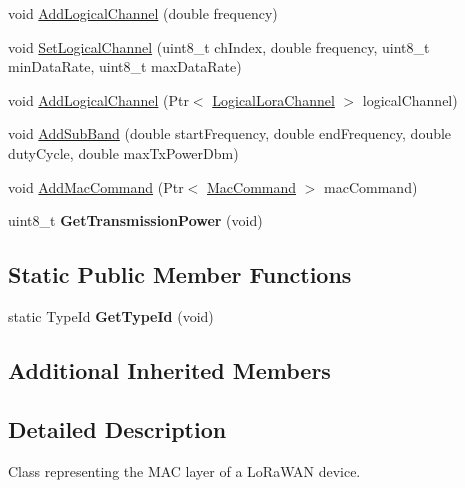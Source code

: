 \begin{DoxyCompactItemize}
void \hyperlink{classns3_1_1lorawan_1_1EndDeviceLoraMac_a35d02edc0a4259d5a6a165579a08391b}{Add\+Logical\+Channel} (double frequency)
\item 
void \hyperlink{classns3_1_1lorawan_1_1EndDeviceLoraMac_aad7490b330e71e9d664dd278b2c294b6}{Set\+Logical\+Channel} (uint8\+\_\+t ch\+Index, double frequency, uint8\+\_\+t min\+Data\+Rate, uint8\+\_\+t max\+Data\+Rate)
\item 
void \hyperlink{classns3_1_1lorawan_1_1EndDeviceLoraMac_a024d4b672a6b0fd3e8e6d3087dac7d6a}{Add\+Logical\+Channel} (Ptr$<$ \hyperlink{classns3_1_1lorawan_1_1LogicalLoraChannel}{Logical\+Lora\+Channel} $>$ logical\+Channel)
\item 
void \hyperlink{classns3_1_1lorawan_1_1EndDeviceLoraMac_a0ec4f0dc1b5fe2feb17125f5d3fbb3b9}{Add\+Sub\+Band} (double start\+Frequency, double end\+Frequency, double duty\+Cycle, double max\+Tx\+Power\+Dbm)
\item 
void \hyperlink{classns3_1_1lorawan_1_1EndDeviceLoraMac_a9c830a6ebb06b450727f7c226e0e2c01}{Add\+Mac\+Command} (Ptr$<$ \hyperlink{classns3_1_1lorawan_1_1MacCommand}{Mac\+Command} $>$ mac\+Command)
\item 
\mbox{\label{classns3_1_1lorawan_1_1EndDeviceLoraMac_aca59855646351574a5c8bf593615c375}} 
uint8\+\_\+t {\bfseries Get\+Transmission\+Power} (void)
\end{DoxyCompactItemize}
\subsection*{Static Public Member Functions}
\begin{DoxyCompactItemize}
\item 
\mbox{\label{classns3_1_1lorawan_1_1EndDeviceLoraMac_af7ddbf9c251ea22cae05c6dd70da5a9f}} 
static Type\+Id {\bfseries Get\+Type\+Id} (void)
\end{DoxyCompactItemize}
\subsection*{Additional Inherited Members}


\subsection{Detailed Description}
Class representing the M\+AC layer of a Lo\+Ra\+W\+AN device. 

